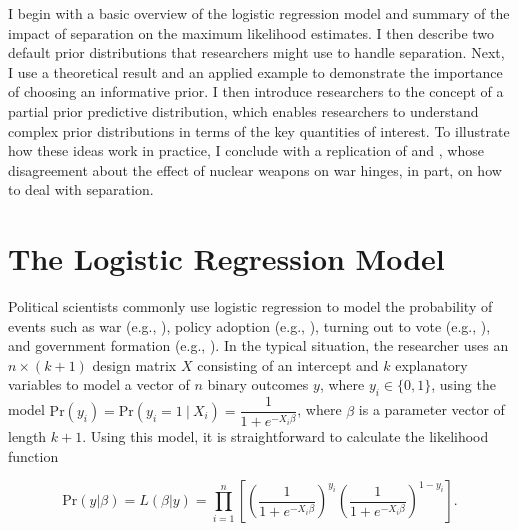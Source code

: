 \documentclass[12pt]{article}
\begin{document}
I begin with a basic overview of the logistic regression model and summary of the impact of separation on the maximum likelihood estimates. I then describe two default prior distributions that researchers might use to handle separation. Next, I use a theoretical result and an applied example to demonstrate the importance of choosing an informative prior. I then introduce researchers to the concept of a partial prior predictive distribution, which enables researchers to understand complex prior distributions in terms of the key quantities of interest. To illustrate how these ideas work in practice, I conclude with a replication of \cite{Rauchhaus2009} and \cite{BellMiller2014}, whose disagreement about the effect of nuclear weapons on war hinges, in part, on how to deal with separation.

\section*{The Logistic Regression Model}

Political scientists commonly use logistic regression to model the probability of events such as war (e.g., \citealt{Fearon1994}), policy adoption (e.g., \citealt{BerryBerry1990}), turning out to vote (e.g., \citealt{WolfingerRosenstone1980}), and government formation (e.g., \citealt{MartinStevenson2001}). In the typical situation, the researcher uses an $n \times (k + 1)$ design matrix $X$ consisting of an intercept and $k$ explanatory variables to model a vector of $n$ binary outcomes $y$, where $y_i \in \{0, 1\}$, using the model $\text{Pr}(y_i) = \text{Pr}(y_i = 1~|~ X_i) = \dfrac{1}{1 + e^{-X_i\beta}}$, where $\beta$ is a parameter vector of length $k + 1$. Using this model, it is straightforward to calculate the likelihood function 

\begin{equation}\nonumber
\text{Pr}(y | \beta) = L(\beta | y) = \displaystyle \prod_{i = 1}^n \left[\left( \dfrac{1}{1 + e^{-X_i\beta}}\right)^{y_i}\left( \dfrac{1}{1 + e^{-X_i\beta}}\right)^{1 - y_i}\right]\text{.}
\end{equation}

%
%
%
\end{document}
